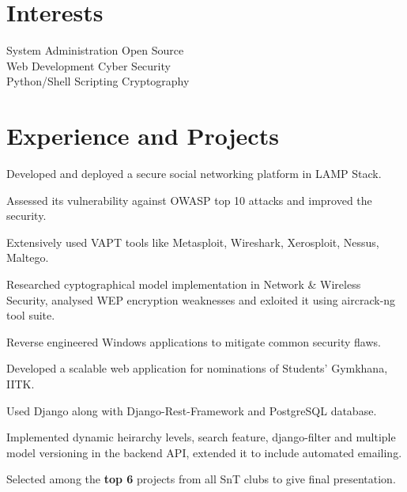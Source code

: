 \documentclass[]{deedy-resume-openfont}
\begin{document}
\begin{minipage}[t]{0.30\textwidth}
\section{Interests}
System Administration \textbullet{}Open Source \\
Web Development \textbullet{} Cyber Security \\
Python/Shell Scripting  \textbullet{} Cryptography \\

%
%

\end{minipage} 
\hfill
\begin{minipage}[t]{0.70\textwidth} 

\vspace{-0.7cm}
\section{Experience and Projects}
\vspace{\topsep} %
\begin{tightemize}
  \item Developed and deployed a secure social networking platform in LAMP Stack. 
  \item Assessed its vulnerability against OWASP top 10 attacks and improved the security.
  \item Extensively used VAPT tools like Metasploit, Wireshark, Xerosploit, Nessus, Maltego.
  \item	Researched cyptographical model implementation in Network \& Wireless Security, analysed WEP encryption weaknesses and exloited it using aircrack-ng tool suite.
  \item Reverse engineered Windows applications to mitigate common security flaws.
\end{tightemize}


\vspace{0cm} %
\begin{tightemize}
  \item Developed a scalable web application for nominations of Students' Gymkhana, IITK.
  \item Used Django along with Django-Rest-Framework and PostgreSQL database.
  \item	Implemented dynamic heirarchy levels, search feature, django-filter and multiple model versioning in the backend API, extended it to include automated emailing. \\
  \item Selected among the \textbf{top 6} projects from all SnT clubs to give final presentation.
\end{tightemize}


\end{minipage}
\end{document}
